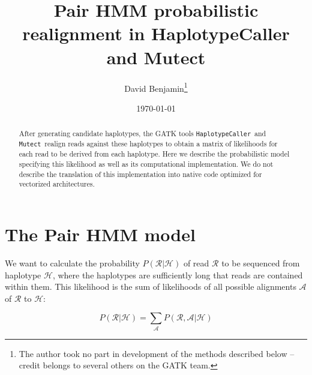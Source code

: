 \documentclass[nofootinbib,amssymb,amsmath]{revtex4}
\newcommand{\HC}{\texttt{HaplotypeCaller}}
\newcommand{\Mutect}{\texttt{Mutect}}
\newcommand{\mc}[1]{\mathcal{#1}}
\begin{document}
\title{Pair HMM probabilistic realignment in HaplotypeCaller and Mutect}
\author{David Benjamin\footnote{The author took no part in development of the methods described below -- credit belongs to several others on the GATK team. }}

\date{\today}

\begin{abstract}
After generating candidate haplotypes, the GATK tools \HC~and \Mutect~realign reads against these haplotypes to obtain a matrix of likelihoods for each read to be derived from each haplotype.  Here we describe the probabilistic model specifying this likelihood as well as its computational implementation.  We do not describe the translation of this implementation into native code optimized for vectorized architectures.
\end{abstract}

\maketitle

\section{The Pair HMM model}
We want to calculate the probability $P( \mc{R} | \mc{H})$ of read $\mc{R}$ to be sequenced from haplotype $\mc{H}$, where the haplotypes are sufficiently long that reads are contained within them.  This likelihood is the sum of likelihoods of all possible alignments $\mc{A}$ of $\mc{R}$ to $\mc{H}$:

\begin{equation}
P(\mc{R} | \mc{H}) = \sum_{\mc{A}} P(\mc{R}, \mc{A} | \mc{H})
\end{equation}
\end{document}
